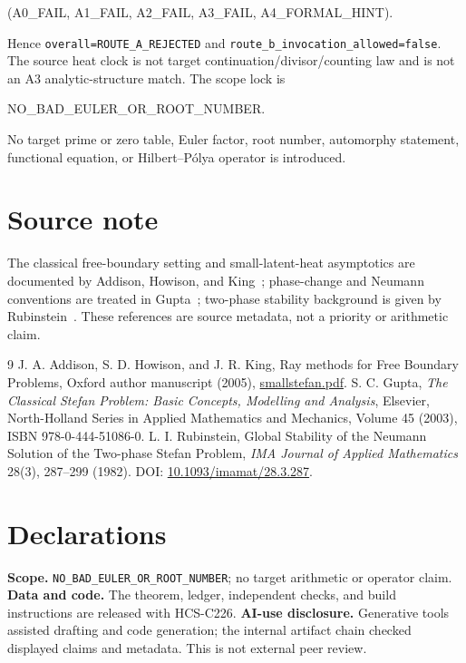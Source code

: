 \documentclass[10pt]{article}
\begin{document}
\begin{center}\ttfamily
(A0\_FAIL, A1\_FAIL, A2\_FAIL, A3\_FAIL, A4\_FORMAL\_HINT).
\end{center}
Hence \texttt{overall=ROUTE\_A\_REJECTED} and
\texttt{route\_b\_invocation\_allowed=false}. The source heat clock is not
target continuation/divisor/counting law and is not an A3 analytic-structure
match. The scope lock is
\begin{center}\ttfamily NO\_BAD\_EULER\_OR\_ROOT\_NUMBER.\end{center}
No target prime or zero table, Euler factor, root number, automorphy statement,
functional equation, or Hilbert--Pólya operator is introduced.
\fi

\enlargethispage{5\baselineskip}
\section*{Source note}
The classical free-boundary setting and small-latent-heat asymptotics are
documented by Addison, Howison, and King~\cite{addison}; phase-change and
Neumann conventions are treated in Gupta~\cite{gupta}; two-phase stability
background is given by Rubinstein~\cite{rubinstein}. These references
are source metadata, not a priority or arithmetic claim.

\begin{thebibliography}{9}\small
\setlength{\itemsep}{0pt}\setlength{\parskip}{0pt}\setlength{\parsep}{0pt}
 J. A. Addison, S. D. Howison, and J. R. King, Ray methods
for Free Boundary Problems, Oxford author manuscript (2005),
\href{https://people.maths.ox.ac.uk/howison/papers/smallstefan.pdf}{smallstefan.pdf}.
 S. C. Gupta, \emph{The Classical Stefan Problem: Basic
Concepts, Modelling and Analysis}, Elsevier, North-Holland Series in Applied
Mathematics and Mechanics, Volume 45 (2003), ISBN 978-0-444-51086-0.
 L. I. Rubinstein, Global Stability of the Neumann Solution
of the Two-phase Stefan Problem, \emph{IMA Journal of Applied Mathematics}
28(3), 287--299 (1982). DOI:
\href{https://doi.org/10.1093/imamat/28.3.287}{10.1093/imamat/28.3.287}.
\end{thebibliography}

\clearpage
\section*{Declarations}
\textbf{Scope.} \texttt{NO\_BAD\_EULER\_OR\_ROOT\_NUMBER}; no target arithmetic
or operator claim. \textbf{Data and code.} The theorem, ledger, independent
checks, and build instructions are released with HCS-C226.
\textbf{AI-use disclosure.} Generative tools assisted drafting and code
generation; the internal artifact chain checked displayed claims and metadata.
This is not external peer review.
\end{document}
